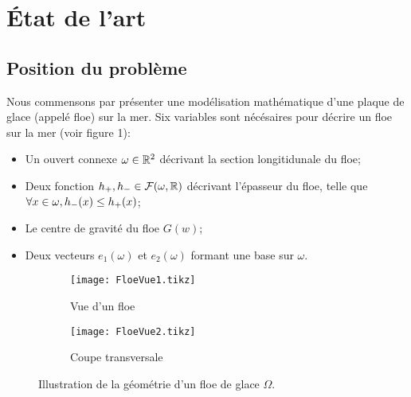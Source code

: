 

\chapter{État de l'art} %

\label{Chapter3} %



\section{Position du problème}

Nous commensons par présenter une modélisation mathématique d'une plaque de glace (appelé floe) sur la mer. Six variables sont nécésaires pour décrire un floe sur la mer (voir figure 1): 
\begin{itemize}
    \item Un ouvert connexe $\omega \in \mathbb{R}^2$ décrivant la section longitidunale du floe;
    \item Deux fonction $h_{+}, h_{-} \in \mathcal{F}(\omega, \mathbb{R})$ décrivant l'épasseur du floe, telle que $\forall x \in \omega, h_{-}(x) \leq h_{+}(x)$;
    \item Le centre de gravité du floe $G(w)$;
    \item Deux vecteurs $e_1(\omega)$ et $e_2(\omega)$ formant une base sur $\omega$.
\end{itemize}

\begin{figure}[H]
    \centering
    \begin{subfigure}[b]{0.45\textwidth}
        \centering
        \texttt{[image: FloeVue1.tikz]} 
        \caption{Vue d'un floe}
    \end{subfigure}
    \begin{subfigure}[b]{0.45\textwidth}
        \centering
        \texttt{[image: FloeVue2.tikz]} 
        \caption{Coupe transversale}
        \label{fig:flo2}
    \end{subfigure}
       \caption{Illustration de la géométrie d'un floe de glace $\Omega$.}
       \label{fig:floe}
\end{figure}

